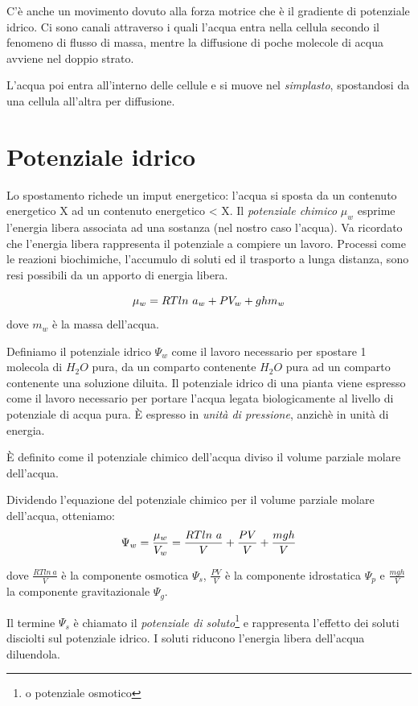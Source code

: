 \documentclass[a4paper,12pt]{book}
\begin{document}
C'è anche un movimento dovuto alla forza motrice che è il gradiente di potenziale idrico. Ci sono canali attraverso i quali l'acqua entra nella cellula secondo il fenomeno di flusso di massa, mentre la diffusione di poche molecole di acqua avviene nel doppio strato.

L'acqua poi entra all'interno delle cellule e si muove nel \emph{simplasto}, spostandosi da una cellula all'altra per diffusione.

\section{Potenziale idrico}
Lo spostamento richede un imput energetico: l'acqua si sposta da un contenuto energetico X ad un contenuto energetico < X.
Il \emph{potenziale chimico} $\mu_{w}$ esprime l’energia libera associata ad una sostanza (nel nostro caso l'acqua). Va
ricordato che l’energia libera rappresenta il potenziale a compiere un lavoro. Processi come le reazioni biochimiche, l’accumulo di soluti ed il trasporto a lunga distanza, sono resi possibili da un apporto di energia libera.

\begin{equation}
\centering
\mu_{w}=RT ln \ {} a_{w} + PV_{w} + ghm_{w}
\end{equation}
dove $m_{w}$ è la massa dell'acqua.

Definiamo il potenziale idrico $\Psi_{w}$ come il lavoro necessario per spostare 1 molecola di $H_{2}O$ pura, da un comparto contenente $H_{2}O$ pura ad un comparto contenente una soluzione diluita.
Il potenziale idrico di una pianta viene espresso come il lavoro necessario per portare l'acqua
legata biologicamente al livello di potenziale di acqua pura. È espresso in \emph{unità di pressione}, anzichè in unità di energia.

È definito come il potenziale chimico dell'acqua diviso il volume parziale molare dell'acqua.

Dividendo l'equazione del potenziale chimico per il volume parziale molare dell'acqua, otteniamo:
\begin{equation}
\centering
\Psi_{w}= \frac{\mu_{w}}{V_{w}}= \frac{RT ln \ {} a}{V} + \frac{PV}{V} + \frac{mgh}{V}
\end{equation}

dove $\frac{RT ln \ {} a}{V}$ è la componente osmotica $\Psi_{s}$, $\frac{PV}{V}$ è la componente idrostatica $\Psi_{p}$ e $\frac{mgh}{V}$ la componente gravitazionale $\Psi_{g}$.

Il termine $\Psi_{s}$ è chiamato il \emph{potenziale di soluto}\footnote{o potenziale osmotico} e rappresenta l'effetto dei soluti disciolti sul potenziale idrico. I soluti riducono l'energia libera dell'acqua diluendola.
\end{document}
